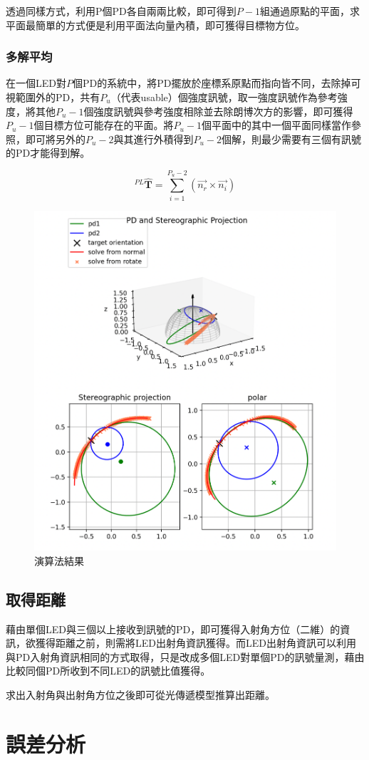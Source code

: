 透過同樣方式，利用P個PD各自兩兩比較，即可得到$P-1$組通過原點的平面，求平面最簡單的方式便是利用平面法向量內積，即可獲得目標物方位。

\subsubsection{多解平均}

在一個LED對$P$個PD的系統中，將PD擺放於座標系原點而指向皆不同，去除掉可視範圍外的PD，共有$P_u$（代表usable）個強度訊號，取一強度訊號作為參考強度，將其他$P_u-1$個強度訊號與參考強度相除並去除朗博次方的影響，即可獲得$P_u-1$個目標方位可能存在的平面。將$P_u-1$個平面中的其中一個平面同樣當作參照，即可將另外的$P_u-2$與其進行外積得到$P_u-2$個解，則最少需要有三個有訊號的PD才能得到解。

\begin{equation}
    ^{PL}\hat{\boldsymbol{T}} = 
    \sum_{i=1}^{P_u-2} (\vec{n_{r}}\times\vec{n_{i}})
\end{equation}

\begin{figure}[ht]
    \centering
    \includegraphics[width=12cm]{ch3pic/solve_targetori.png}
    \caption{演算法結果}
    \label{solve_ori}
\end{figure}


\subsection{取得距離}

藉由單個LED與三個以上接收到訊號的PD，即可獲得入射角方位（二維）的資訊，欲獲得距離之前，則需將LED出射角資訊獲得。而LED出射角資訊可以利用與PD入射角資訊相同的方式取得，只是改成多個LED對單個PD的訊號量測，藉由比較同個PD所收到不同LED的訊號比值獲得。


求出入射角與出射角方位之後即可從光傳遞模型推算出距離。

\section{誤差分析}
